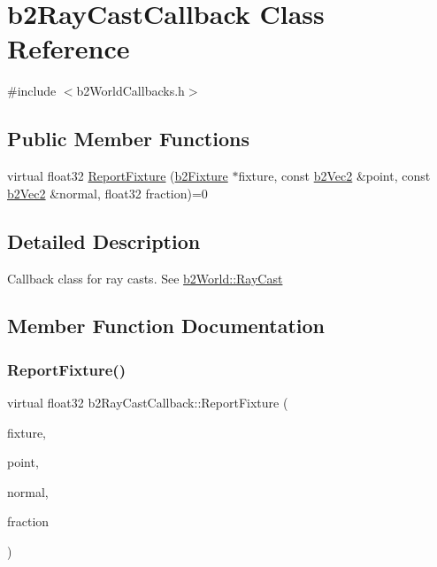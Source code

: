 \hypertarget{classb2RayCastCallback}{}\section{b2\+Ray\+Cast\+Callback Class Reference}
\label{classb2RayCastCallback}


{\ttfamily \#include $<$b2\+World\+Callbacks.\+h$>$}

\subsection*{Public Member Functions}
\begin{DoxyCompactItemize}
\item 
virtual float32 \mbox{\hyperlink{classb2RayCastCallback_a658d5c8e89e0c73230cc8bddade4f3a4}{Report\+Fixture}} (\mbox{\hyperlink{classb2Fixture}{b2\+Fixture}} $\ast$fixture, const \mbox{\hyperlink{structb2Vec2}{b2\+Vec2}} \&point, const \mbox{\hyperlink{structb2Vec2}{b2\+Vec2}} \&normal, float32 fraction)=0
\end{DoxyCompactItemize}


\subsection{Detailed Description}
Callback class for ray casts. See \mbox{\hyperlink{classb2World_aa9955d94a254253997daaf16ce77bab6}{b2\+World\+::\+Ray\+Cast}} 

\subsection{Member Function Documentation}
\mbox{\label{classb2RayCastCallback_a658d5c8e89e0c73230cc8bddade4f3a4}} 
\subsubsection{\texorpdfstring{Report\+Fixture()}{ReportFixture()}}
{\footnotesize\ttfamily virtual float32 b2\+Ray\+Cast\+Callback\+::\+Report\+Fixture (\begin{DoxyParamCaption}\item[{\mbox{\hyperlink{classb2Fixture}{b2\+Fixture}} $\ast$}]{fixture,  }\item[{const \mbox{\hyperlink{structb2Vec2}{b2\+Vec2}} \&}]{point,  }\item[{const \mbox{\hyperlink{structb2Vec2}{b2\+Vec2}} \&}]{normal,  }\item[{float32}]{fraction }\end{DoxyParamCaption})\hspace{0.3cm}{\ttfamily [pure virtual]}}


